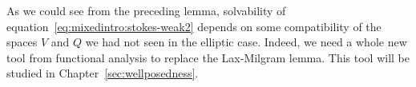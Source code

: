 \begin{remark}
  As we could see from the preceding lemma, solvability of
  equation~\eqref{eq:mixedintro:stokes-weak2} depends on some
  compatibility of the spaces $V$ and $Q$ we had not seen in the
  elliptic case. Indeed, we need a whole new tool from functional
  analysis to replace the Lax-Milgram lemma. This tool will be studied
  in Chapter~\ref{sec:wellposedness}.
\end{remark}

